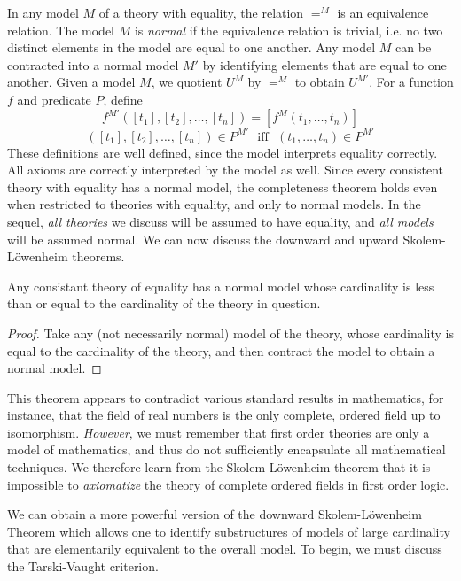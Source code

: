 In any model $M$ of a theory with equality, the relation $=^M$ is an equivalence relation. The model $M$ is \emph{normal} if the equivalence relation is trivial, i.e. no two distinct elements in the model are equal to one another. Any model $M$ can be contracted into a normal model $M'$ by identifying elements that are equal to one another. Given a model $M$, we quotient $U^M$ by $=^M$ to obtain $U^{M'}$. For a function $f$ and predicate $P$, define
%
\[ f^{M'}([t_1],[t_2],\dots,[t_n]) = [f^M(t_1, \dots, t_n)] \]
%
\[ ([t_1],[t_2],\dots,[t_n]) \in P^{M'}\ \ \ \text{iff}\ \ \ (t_1, \dots, t_n) \in P^{M'} \]
%
These definitions are well defined, since the model interprets equality correctly. All axioms are correctly interpreted by the model as well. Since every consistent theory with equality has a normal model, the completeness theorem holds even when restricted to theories with equality, and only to normal models. In the sequel, \emph{all theories} we discuss will be assumed to have equality, and \emph{all models} will be assumed normal. We can now discuss the downward and upward Skolem-L\"{o}wenheim theorems.

\begin{prop}
    Any consistant theory of equality has a normal model whose cardinality is less than or equal to the cardinality of the theory in question.
\end{prop}
\begin{proof}
    Take any (not necessarily normal) model of the theory, whose cardinality is equal to the cardinality of the theory, and then contract the model to obtain a normal model.
\end{proof}

This theorem appears to contradict various standard results in mathematics, for instance, that the field of real numbers is the only complete, ordered field up to isomorphism. \emph{However}, we must remember that first order theories are only a model of mathematics, and thus do not sufficiently encapsulate all mathematical techniques. We therefore learn from the Skolem-L\"{o}wenheim theorem that it is impossible to \emph{axiomatize} the theory of complete ordered fields in first order logic.

We can obtain a more powerful version of the downward Skolem-L\"{o}wenheim Theorem which allows one to identify substructures of models of large cardinality that are elementarily equivalent to the overall model. To begin, we must discuss the Tarski-Vaught criterion.

